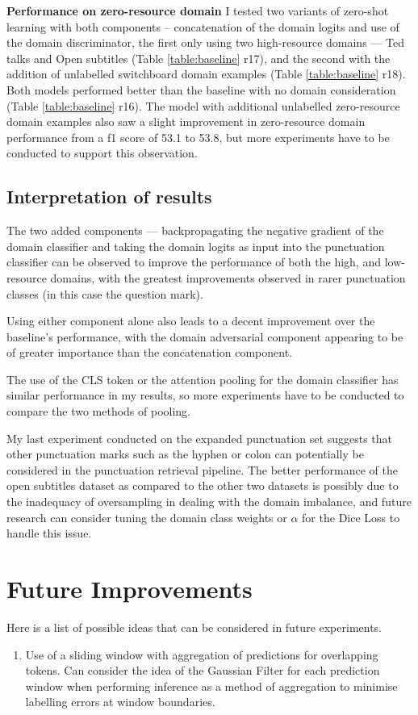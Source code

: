 \documentclass[a4paper]{article}
\begin{document}
\begin{multicols}{2}
\textbf{Performance on zero-resource domain}
I tested two variants of zero-shot learning with both components -- concatenation of the domain logits and use of the domain discriminator, the first only using two high-resource domains --- Ted talks and Open subtitles (Table \ref{table:baseline} r17), and the second with the addition of unlabelled switchboard domain examples (Table \ref{table:baseline} r18). Both models performed better than the baseline with no domain consideration (Table \ref{table:baseline} r16). The model with additional unlabelled zero-resource domain examples also saw a slight improvement in zero-resource domain performance from a f1 score of 53.1 to 53.8, but more experiments have to be conducted to support this observation.

\subsection{Interpretation of results}

The two added components --- backpropagating the negative gradient of the domain classifier and taking the domain logits as input into the punctuation classifier can be observed to improve the performance of both the high, and low-resource domains, with the greatest improvements observed in rarer punctuation classes (in this case the question mark). 

Using either component alone also leads to a decent improvement over the baseline's performance, with the domain adversarial component appearing to be of greater importance than the concatenation component. 

The use of the CLS token or the attention pooling for the domain classifier has similar performance in my results, so more experiments have to be conducted to compare the two methods of pooling.

My last experiment conducted on the expanded punctuation set suggests that other punctuation marks such as the hyphen  or colon can potentially be considered in the punctuation retrieval pipeline. The better performance of the open subtitles dataset as compared to the other two datasets is possibly due to the inadequacy of oversampling in dealing with the domain imbalance, and future research can consider tuning the domain class weights or $\alpha$ for the Dice Loss to handle this issue.

\section{Future Improvements}
Here is a list of possible ideas that can be considered in future experiments.
\begin{enumerate}
    \item Use of a sliding window with aggregation of predictions for overlapping tokens. Can consider the idea of the Gaussian Filter for each prediction window when performing inference as a method of aggregation to minimise labelling errors at window boundaries.
    

\end{enumerate}
\end{multicols}
\end{document}
